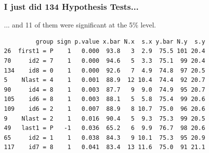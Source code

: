 \documentclass[handout]{beamer}
\begin{document}
\begin{frame}[c,fragile]\frametitle{I just did 134 Hypothesis Tests...}
   
 \begin{block}
 	{... and 11 of them were significant at the 5\% level.}
 \end{block}

\footnotesize

\begin{verbatim}
         group sign p.value x.bar N.x  s.x y.bar N.y  s.y
26  first1 = P    1   0.000  93.8   3  2.9  75.5 101 20.4
70     id2 = 7    1   0.000  94.6   5  3.3  75.1  99 20.4
134    id8 = 0    1   0.000  92.6   7  4.9  74.8  97 20.5
5    Nlast = 4    1   0.001  88.9  12 10.4  74.4  92 20.7
90     id4 = 8    1   0.003  87.7   9  9.0  74.9  95 20.7
105    id6 = 8    1   0.003  88.1   5  5.8  75.4  99 20.6
109    id6 = 2    1   0.007  88.9   8 10.7  75.0  96 20.6
9    Nlast = 2    1   0.016  90.4   5  9.3  75.3  99 20.5
49   last1 = P   -1   0.036  65.2   6  9.9  76.7  98 20.6
65     id2 = 1    1   0.038  84.3   9 10.1  75.3  95 20.9
117    id7 = 8    1   0.041  83.4  13 11.6  75.0  91 21.1
\end{verbatim}
\end{frame}




\end{document}
